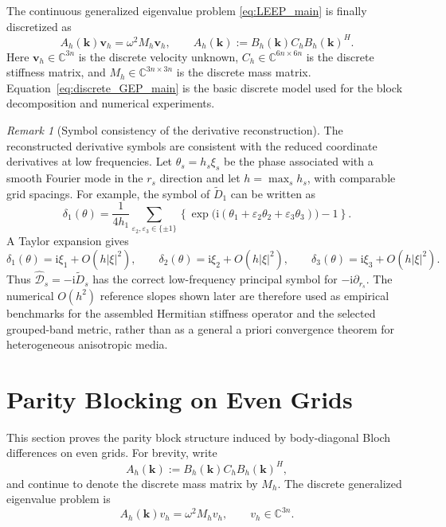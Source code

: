 \documentclass[11pt,oneside]{article}
\numberwithin{equation}{section}
\theoremstyle{plain}
\theoremstyle{remark}
\newtheorem{remark}[theorem]{Remark}
\newcommand{\bk}{\bm{k}}
\begin{document}
The continuous generalized eigenvalue problem \eqref{eq:LEEP_main} is finally discretized as
\begin{equation}\label{eq:discrete_GEP_main}
A_h(\bk)\mathbf v_h=\omega^2 M_h\mathbf v_h,
\qquad
A_h(\bk):=B_h(\bk)C_hB_h(\bk)^H .
\end{equation}
Here \(\mathbf v_h\in\mathbb C^{3n}\) is the discrete velocity unknown, \(C_h\in\mathbb C^{6n\times6n}\) is the discrete stiffness matrix, and \(M_h\in\mathbb C^{3n\times3n}\) is the discrete mass matrix. Equation~\eqref{eq:discrete_GEP_main} is the basic discrete model used for the block decomposition and numerical experiments.

\begin{remark}[Symbol consistency of the derivative reconstruction]
\label{rem:symbol_consistency}
The reconstructed derivative symbols are consistent with the reduced coordinate derivatives at low frequencies. Let \(\theta_s=h_s\xi_s\) be the phase associated with a smooth Fourier mode in the \(r_s\) direction and let \(h=\max_s h_s\), with comparable grid spacings. For example, the symbol of \(\widetilde D_1\) can be written as
\[
\delta_1(\theta)
=\frac{1}{4h_1}\sum_{\varepsilon_2,\varepsilon_3\in\{\pm1\}}
\left\{\exp\bigl(\mathrm i(\theta_1+\varepsilon_2\theta_2+\varepsilon_3\theta_3)\bigr)-1\right\}.
\]
A Taylor expansion gives
\[
\delta_1(\theta)=\mathrm i\xi_1+O(h|\xi|^2),
\qquad
\delta_2(\theta)=\mathrm i\xi_2+O(h|\xi|^2),
\qquad
\delta_3(\theta)=\mathrm i\xi_3+O(h|\xi|^2).
\]
Thus \(\widehat{\mathcal D}_s=-\mathrm i\widetilde D_s\) has the correct low-frequency principal symbol for \(-\mathrm i\partial_{r_s}\). The numerical \(O(h^2)\) reference slopes shown later are therefore used as empirical benchmarks for the assembled Hermitian stiffness operator and the selected grouped-band metric, rather than as a general a priori convergence theorem for heterogeneous anisotropic media.
\end{remark}

\section{Parity Blocking on Even Grids}
\label{sec:block}

This section proves the parity block structure induced by body-diagonal Bloch differences on even grids. For brevity, write
\[
A_h(\bk):=B_h(\bk)C_hB_h(\bk)^H,
\]
and continue to denote the discrete mass matrix by \(M_h\). The discrete generalized eigenvalue problem is
\[
A_h(\bk)v_h=\omega^2M_hv_h,
\qquad v_h\in\mathbb C^{3n}.
\]
\end{document}
